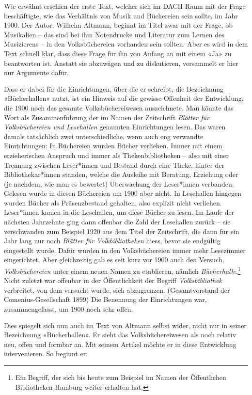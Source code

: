 \documentclass[a4paper,
fontsize=11pt,
oneside,
numbers=noperiodatend,
parskip=half-,
bibliography=totoc,
final
]{scrartcl}
\begin{document}
Wie erwähnt erschien der erste Text, welcher sich im DACH-Raum mit der
Frage beschäftigte, wie das Verhältnis von Musik und Büchereien sein
sollte, im Jahr 1900. Der Autor, Wilhelm Altmann, beginnt im Titel zwar
mit der Frage, ob Musikalien -- das sind bei ihm Notendrucke und
Literatur zum Lernen des Musizierens -- in den Volksbüchereien vorhanden
sein sollten. Aber es wird in dem Text schnell klar, dass diese Frage
für ihn von Anfang an mit einem «Ja» zu beantworten ist. Anstatt sie
abzuwägen und zu diskutieren, versammelt er hier nur Argumente dafür.

Dass er dabei für die Einrichtungen, über die er schreibt, die
Bezeichnung «Bücherhallen» nutzt, ist ein Hinweis auf die gewisse
Offenheit der Entwicklung, die 1900 noch das gesamte Volksbüchereiwesen
auszeichnete. Man könnte das Wort als Zusammenführung der im Namen der
Zeitschrift \emph{Blätter für Volksbüchereien und Lesehallen} genannten
Einrichtungen lesen. Das waren damals tatsächlich zwei unterschiedliche,
wenn auch eng verwandte Einrichtungen: In Büchereien wurden Bücher
verliehen. Immer mit einem erzieherischen Anspruch und immer als
Thekenbibliotheken -- also mit einer Trennung zwischen Leser*innen und
Bestand durch eine Theke, hinter der Bibliothekar*innen standen, welche
die Ausleihe mit Beratung, Erziehung oder (je nachdem, wie man es
bewertet) Überwachung der Leser*innen verbanden. Gelesen wurde in diesen
Büchereien um 1900 aber nicht. In Lesehallen hingegen wurden Bücher als
Präsenzbestand gehalten, also explizit nicht verliehen. Leser*innen
kamen in die Lesehallen, um diese Bücher zu lesen. Im Laufe der nächsten
Jahrzehnte ging dann offenbar die Zahl der Lesehallen zurück -- sie
verschwanden zum Beispiel 1920 aus dem Titel der Zeitschrift, die dann
für ein Jahr lang nur noch \emph{Blätter für Volkbibliotheken} hiess,
bevor sie endgültig eingestellt wurde. Dafür wurden in den
Volksbüchereien immer mehr Lesezimmer eingerichtet. Aber gleichzeitig
gab es seit kurz vor 1900 auch den Versuch, \emph{Volksbüchereien} unter
einem neuen Namen zu etablieren, nämlich \emph{Bücherhalle}.\footnote{Ein
  Begriff, der sich bis heute zum Beispiel im Namen der Öffentlichen
  Bibliotheken Hamburg weiter erhalten hat.} Nicht zuletzt war offenbar
in der Öffentlichkeit der Begriff \emph{Volksbibliothek} verbreitet, von
dem versucht wurde, sich abzugrenzen. (Gesamtvorstand der
Comenius-Gesellschaft 1899) Die Benennung der Einrichtungen war,
zusammengefasst, um 1900 noch sehr offen.

Dies spiegelt sich nun auch im Text von Altmann selbst wider, nicht nur
in seiner Bezeichnung «Bücherhallen». Er sieht das Volksbüchereiwesen
als noch relativ neu, offen und formbar an. Mit seinem Artikel möchte er
in diese Entwicklung intervenieren. So beginnt er:
\end{document}
